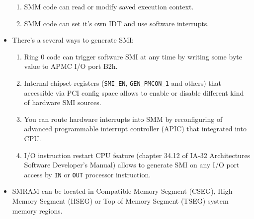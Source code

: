 \begin{note}
\begin{itemize}
\begin{enumerate}
		\item SMM code can read or modify saved execution context.
		\item SMM code can set it’s own IDT and use software interrupts.
	\end{enumerate}
	\item There’s a several ways to generate SMI:
	\begin{enumerate}
		\item Ring 0 code can trigger software SMI at any time by writing some byte value to APMC I/O port B2h.
		\item Internal chipset registers (\verb|SMI_EN|, \verb|GEN_PMCON_1| and others) that accessible via PCI config space allows to enable or disable different kind of hardware SMI sources.
		\item You can route hardware interrupts into SMM by reconfiguring of advanced programmable interrupt controller (APIC) that integrated into CPU.
		\item I/O instruction restart CPU feature (chapter 34.12 of IA-32 Architectures Software Developer’s Manual) allows to generate SMI on any I/O port access by \verb|IN| or \verb|OUT| processor instruction.
	\end{enumerate}
	\item SMRAM can be located in Compatible Memory Segment (CSEG), High Memory Segment (HSEG) or Top of Memory Segment (TSEG) system memory regions.
\end{itemize}
\end{note}